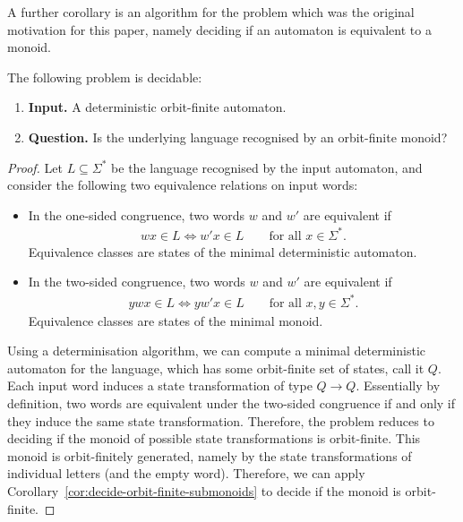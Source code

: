A further corollary is an algorithm for the problem which was the original motivation for this paper, namely deciding if an automaton is equivalent to a monoid.
\begin{corollary}
    The following problem is decidable: 
    \begin{enumerate}
        \item \textbf{Input.} A deterministic orbit-finite automaton.
        \item \textbf{Question.} Is the underlying language recognised by  an orbit-finite monoid?
    \end{enumerate}
\end{corollary}
\begin{proof}
Let $L \subseteq \Sigma^*$ be the language recognised by the input automaton, and consider the following two equivalence relations on input words:
    \begin{itemize}
        \item In the one-sided congruence, two words $w$ and $w'$ are equivalent if 
        \begin{align*}
        wx \in L \iff w'x \in L \qquad \text{for all } x \in \Sigma^*.
        \end{align*}
        Equivalence classes are states of the minimal deterministic automaton.
        \item In the two-sided congruence, two words $w$ and $w'$ are equivalent if
        \begin{align*}
        ywx \in L \iff yw'x \in L \qquad \text{for all } x,y \in \Sigma^*.
        \end{align*}
        Equivalence classes are states of the minimal  monoid.
    \end{itemize}
    Using a determinisation algorithm, we can compute a minimal deterministic automaton for the language, which has some orbit-finite set of states, call it $Q$. Each input word induces a state transformation of type $Q \to Q$. Essentially by definition,  two words are equivalent under the two-sided congruence if and only if they induce the same state transformation. Therefore, the problem reduces to  deciding if the monoid of possible state transformations is orbit-finite. This monoid is orbit-finitely generated, namely by the state transformations of individual letters (and the empty word). Therefore, we can apply Corollary~\ref{cor:decide-orbit-finite-submonoids} to decide if the monoid is orbit-finite.
\end{proof}
